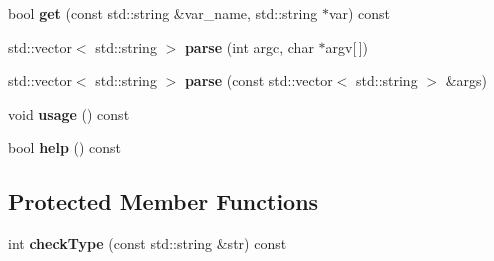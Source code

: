\begin{DoxyCompactItemize}
bool {\bfseries get} (const std\+::string \&var\+\_\+name, std\+::string $\ast$var) const
\item 
\hypertarget{classskl_1_1_opt_parser_a97bc22822e584f3766a35b089b47ab96}{}\label{classskl_1_1_opt_parser_a97bc22822e584f3766a35b089b47ab96} 
std\+::vector$<$ std\+::string $>$ {\bfseries parse} (int argc, char $\ast$argv\mbox{[}$\,$\mbox{]})
\item 
\hypertarget{classskl_1_1_opt_parser_a5f4ca7a65af552f6b2d14b89efdf4a9c}{}\label{classskl_1_1_opt_parser_a5f4ca7a65af552f6b2d14b89efdf4a9c} 
std\+::vector$<$ std\+::string $>$ {\bfseries parse} (const std\+::vector$<$ std\+::string $>$ \&args)
\item 
\hypertarget{classskl_1_1_opt_parser_a051739884bbb805d84ac301da7c93673}{}\label{classskl_1_1_opt_parser_a051739884bbb805d84ac301da7c93673} 
void {\bfseries usage} () const
\item 
\hypertarget{classskl_1_1_opt_parser_af22343fc946d98c029e8699b9e15abf2}{}\label{classskl_1_1_opt_parser_af22343fc946d98c029e8699b9e15abf2} 
bool {\bfseries help} () const
\end{DoxyCompactItemize}
\subsection*{Protected Member Functions}
\begin{DoxyCompactItemize}
\item 
\hypertarget{classskl_1_1_opt_parser_a07d5d90a99e9c3058d245f1d79939e1e}{}\label{classskl_1_1_opt_parser_a07d5d90a99e9c3058d245f1d79939e1e} 
int {\bfseries check\+Type} (const std\+::string \&str) const
\end{DoxyCompactItemize}
